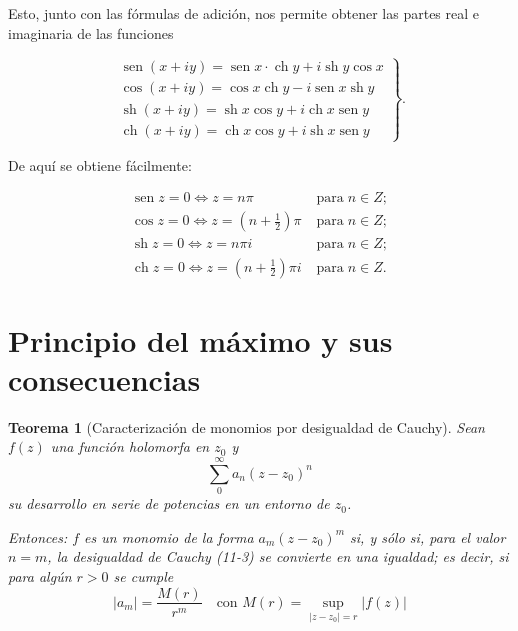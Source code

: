 \documentclass[10pt]{article}
\theoremstyle{plain}
\newtheorem{theorem}{Teorema}[section]
\theoremstyle{definition}
\theoremstyle{remark}
\begin{document}
Esto, junto con las fórmulas de adición, nos permite obtener las partes real e imaginaria de las funciones

\[
\left.\begin{array}{l}
\operatorname{sen}(x+i y)=\operatorname{sen} x \cdot \operatorname{ch} y+i \operatorname{sh} y \cos x  \tag{12-18}\\
\cos (x+i y)=\cos x \operatorname{ch} y-i \operatorname{sen} x \operatorname{sh} y \\
\operatorname{sh}(x+i y)=\operatorname{sh} x \cos y+i \operatorname{ch} x \operatorname{sen} y \\
\operatorname{ch}(x+i y)=\operatorname{ch} x \cos y+i \operatorname{sh} x \operatorname{sen} y
\end{array}\right\} .
\]

De aquí se obtiene fácilmente:

$$
\begin{array}{ll}
\operatorname{sen} z=0 \Leftrightarrow z=n \pi & \operatorname{para} n \in Z ; \\
\cos z=0 \Longleftrightarrow z=\left(n+\frac{1}{2}\right) \pi & \operatorname{para} n \in Z ; \\
\operatorname{sh} z=0 \Longleftrightarrow z=n \pi i & \operatorname{para} n \in Z ; \\
\operatorname{ch} z=0 \Longleftrightarrow z=\left(n+\frac{1}{2}\right) \pi i & \operatorname{para} n \in Z .
\end{array}
$$

\section{Principio del máximo y sus consecuencias}

\begin{theorem}[Caracterización de monomios por desigualdad de Cauchy]
Sean $f(z)$ una función holomorfa en $z_{0}$ y
$$\sum_{0}^{\infty} a_{n}(z-z_{0})^{n}$$
su desarrollo en serie de potencias en un entorno de $z_{0}$.

Entonces: $f$ es un monomio de la forma $a_{m}(z-z_{0})^{m}$ si, y sólo si, para el valor $n=m$, la desigualdad de Cauchy (11-3) se convierte en una igualdad; es decir, si para algún $r>0$ se cumple
\begin{equation*}
\left|a_{m}\right|=\frac{M(r)}{r^{m}} \quad \text{con } M(r)=\sup_{\left|z-z_{0}\right|=r}|f(z)| \tag{13.1}
\end{equation*}
\end{theorem}
\end{document}
